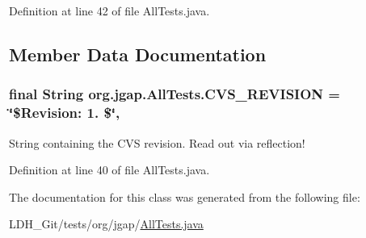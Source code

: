 Definition at line 42 of file All\-Tests.\-java.



\subsection{Member Data Documentation}
\hypertarget{classorg_1_1jgap_1_1_all_tests_ae60d546975e96d3863ce2b9c252c4630}{
\subsubsection[{C\-V\-S\-\_\-\-R\-E\-V\-I\-S\-I\-O\-N}]{\setlength{\rightskip}{0pt plus 5cm}final String org.\-jgap.\-All\-Tests.\-C\-V\-S\-\_\-\-R\-E\-V\-I\-S\-I\-O\-N = \char`\"{}\$Revision\-: 1. \$\char`\"{}\hspace{0.3cm}{\ttfamily [static]}, {\ttfamily [private]}}}\label{classorg_1_1jgap_1_1_all_tests_ae60d546975e96d3863ce2b9c252c4630}
String containing the C\-V\-S revision. Read out via reflection! 

Definition at line 40 of file All\-Tests.\-java.



The documentation for this class was generated from the following file\-:\begin{DoxyCompactItemize}
\item 
L\-D\-H\-\_\-\-Git/tests/org/jgap/\hyperlink{_all_tests_8java}{All\-Tests.\-java}\end{DoxyCompactItemize}

